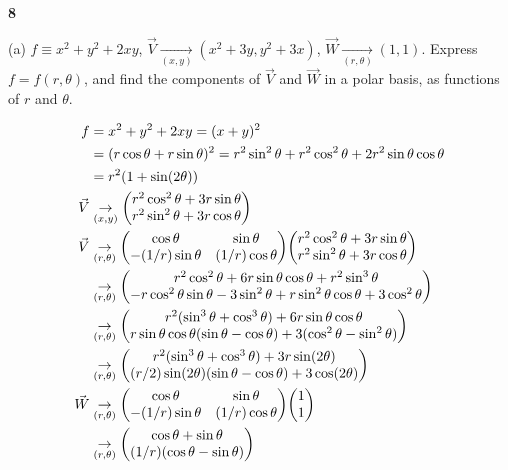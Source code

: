 \documentclass[gr-notes.tex]{subfiles}
\begin{document}
\textbf{8}

(a)
$f \equiv x^2 + y^2 + 2xy$, $\vec{V} \underset{(x,y)}{\to} (x^2 + 3y, y^2 + 3x)$, $\vec{W} \underset{(r,\theta)}{\to} (1, 1)$. Express $f = f(r, \theta)$, and find the components of $\vec{V}$ and $\vec{W}$ in a polar basis, as functions of $r$ and $\theta$.

\begin{align*}
  f &= x^2 + y^2 + 2xy = (x + y)^2
  \\ &=
  (r \cos\theta + r \sin\theta)^2 =
  r^2 \sin^2\theta + r^2 \cos^2\theta + 2 r^2 \sin\theta \cos\theta
  \\ &=
  r^2 (1 + \sin(2 \theta))
  \\
  \vec{V} &\underset{(x,y)}{\to}
  \mqty( r^2 \cos^2\theta + 3 r \sin\theta \\
         r^2 \sin^2\theta + 3 r \cos\theta )
  \\
  \vec{V} &\underset{(r,\theta)}{\to}
  \mqty( \cos\theta & \sin\theta \\
         -(1/r) \sin\theta & (1/r) \cos\theta )
  \mqty( r^2 \cos^2\theta + 3 r \sin\theta \\
         r^2 \sin^2\theta + 3 r \cos\theta )
  \\ &\underset{(r,\theta)}{\to}
  \mqty(
    r^2 \cos^2\theta + 6 r \sin\theta \cos\theta + r^2 \sin^3\theta
    \\
    -r \cos^2\theta \sin\theta - 3 \sin^2\theta +
     r \sin^2\theta \cos\theta + 3 \cos^2\theta
  )
  \\ &\underset{(r,\theta)}{\to}
  \mqty(
    r^2 (\sin^3\theta + \cos^3\theta) + 6 r \sin\theta \cos\theta
    \\
    r \sin\theta \cos\theta (\sin\theta - \cos\theta) +
    3 (\cos^2\theta - \sin^2\theta)
  )
  \\ &\underset{(r,\theta)}{\to}
  \mqty(
    r^2 (\sin^3\theta + \cos^3\theta) + 3 r \sin(2\theta)
    \\
    (r/2) \sin(2\theta) (\sin\theta - \cos\theta) + 3 \cos(2\theta)
  )
  \\
  \vec{W} &\underset{(r,\theta)}{\to}
  \mqty( \cos\theta & \sin\theta \\
         -(1/r) \sin\theta & (1/r) \cos\theta )
  \mqty( 1 \\ 1 )
  \\ &\underset{(r,\theta)}{\to}
  \mqty(
    \cos\theta + \sin\theta
    \\
    (1/r) (\cos\theta - \sin\theta)
  )
\end{align*}
\end{document}
